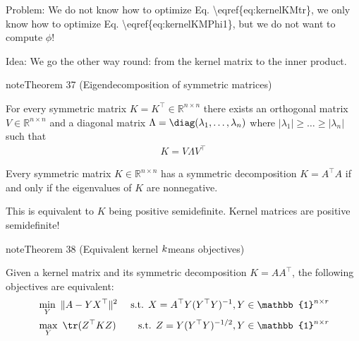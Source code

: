 \documentclass[letterpaper,10pt,english]{jupyterBook}
\begin{document}
\sphinxAtStartPar
Problem: We do not know how to optimize Eq. \textbackslash{}eqref\{eq:kernelKMtr\}, we only know how to optimize Eq. \textbackslash{}eqref\{eq:kernelKMPhi1\}, but we do not want to compute \(\phi\)!

\sphinxAtStartPar
Idea: We go the other way round: from the kernel matrix to the inner product.
\label{clustering_kernel_kmeans:theorem-2}
\begin{sphinxadmonition}{note}{Theorem 37 (Eigendecomposition of symmetric matrices)}



\sphinxAtStartPar
For every symmetric matrix \(K=K^\top\in\mathbb{R}^{n\times n}\) there exists an orthogonal matrix \(V\in\mathbb{R}^{n\times n}\) and a diagonal matrix \(\Lambda=\diag(\lambda_1,\ldots,\lambda_n)\) where \(\lvert \lambda_1\rvert\geq \ldots \geq \lvert \lambda_n\rvert\) such that
\begin{equation*}
\begin{split}K=V\Lambda V^\top\end{split}
\end{equation*}
\end{sphinxadmonition}

\sphinxAtStartPar
Every symmetric matrix \(K\in\mathbb{R}^{n\times n}\) has a symmetric decomposition \(K=A^\top A\) if and only if the eigenvalues of \(K\) are nonnegative.

\sphinxAtStartPar
This is equivalent to \(K\) being positive semi\sphinxhyphen{}definite.
Kernel matrices are positive semi\sphinxhyphen{}definite!
\label{clustering_kernel_kmeans:theorem-3}
\begin{sphinxadmonition}{note}{Theorem 38 (Equivalent kernel \protect\(k\protect\)\sphinxhyphen{}means objectives)}



\sphinxAtStartPar
Given a kernel matrix and its symmetric decomposition \(K=AA^\top\),
the following objectives are equivalent:
\label{equation:clustering_kernel_kmeans:e5be0274-0e7a-47fd-8a4c-ad0867b1097f}\begin{align}
&\min_{Y}\ \|A-YX^\top\|^2 &\text{ s.t. } X= A^\top Y(Y^\top Y)^{-1}, Y\in\mathbb{1}^{n\times r}\label{eq:kmeansA} \\
&\max_{Y}\ \tr(Z^\top K Z)&\text{ s.t. } Z= Y(Y^\top Y)^{-1/2}, Y\in\mathbb{1}^{n\times r} 
\end{align}\end{sphinxadmonition}
\end{document}
